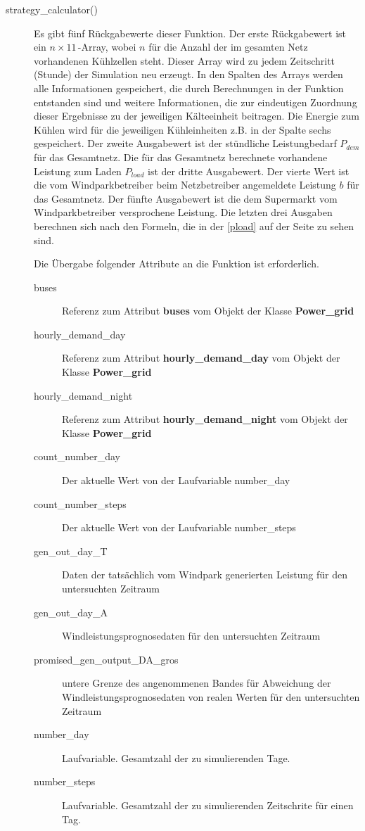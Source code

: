 \begin{description}
\item[strategy\_calculator()] Es gibt f\"unf R\"uckgabewerte dieser Funktion.
Der erste R\"uckgabewert ist ein $n\times11\,$-Array, wobei $n$ f\"ur die Anzahl
der im gesamten Netz vorhandenen K\"uhlzellen steht. Dieser Array wird zu jedem
Zeitschritt (Stunde) der Simulation neu erzeugt. In den Spalten des Arrays
werden alle Informationen gespeichert, die durch Berechnungen in der Funktion
entstanden sind und weitere Informationen, die zur eindeutigen Zuordnung dieser
Ergebnisse zu der jeweiligen K\"alteeinheit beitragen. Die Energie zum K\"uhlen
wird f\"ur die jeweiligen K\"uhleinheiten z.B. in der Spalte sechs gespeichert.
Der zweite Ausgabewert ist der st\"undliche Leistungbedarf $P_{dem}$ f\"ur das
Gesamtnetz.  Die f\"ur das Gesamtnetz berechnete vorhandene Leistung zum Laden
$P_{load}$ ist der dritte Ausgabewert. Der vierte Wert ist die vom
Windparkbetreiber beim Netzbetreiber angemeldete Leistung $b$ f\"ur das
Gesamtnetz. Der f\"unfte Ausgabewert ist die dem Supermarkt vom
Windparkbetreiber versprochene Leistung.  Die letzten drei Ausgaben berechnen
sich nach den Formeln, die in der \cref{pload} auf der Seite \pageref{pload} zu
sehen sind.

Die \"Ubergabe folgender Attribute an die Funktion ist erforderlich.

\begin{description} 
\item[buses] Referenz zum Attribut \textbf{buses} vom Objekt der Klasse
\textbf{Power\_grid}
\item[hourly\_demand\_day] Referenz zum Attribut \textbf{hourly\_demand\_day}
vom Objekt der Klasse \textbf{Power\_grid}
\item[hourly\_demand\_night] Referenz zum Attribut
\textbf{hourly\_demand\_night} vom Objekt der Klasse \textbf{Power\_grid}
\item[count\_number\_day] Der aktuelle Wert von der Laufvariable number\_day
\item[count\_number\_steps] Der aktuelle Wert von der Laufvariable number\_steps
\item[gen\_out\_day\_T] Daten der tats\"achlich vom Windpark generierten
Leistung f\"ur den untersuchten Zeitraum
\item[gen\_out\_day\_A] Windleistungsprognosedaten f\"ur den untersuchten Zeitraum
\item[promised\_gen\_output\_DA\_gros] untere Grenze des angenommenen Bandes
f\"ur Abweichung der Windleistungsprognosedaten von realen Werten f\"ur den
untersuchten Zeitraum
\item[number\_day] Laufvariable. Gesamtzahl der zu simulierenden Tage.
\item[number\_steps] Laufvariable. Gesamtzahl der zu simulierenden Zeitschrite f\"ur einen Tag.
\end{description}

\end{description}

